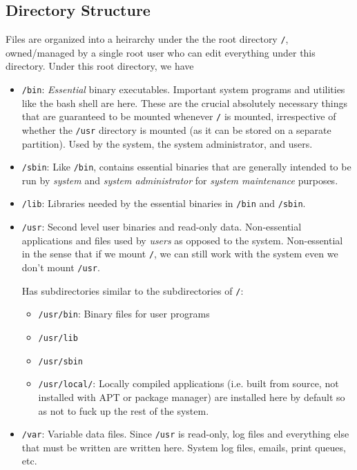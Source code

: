\documentclass[12pt]{article}
\theoremstyle{plain}
\theoremstyle{definition}
\theoremstyle{remark}
\begin{document}
\subsection{Directory Structure}

Files are organized into a heirarchy under the the root directory
\texttt{/}, owned/managed by a single root user who can edit everything
under this directory.
Under this root directory, we have
\begin{itemize}
  \item \texttt{/bin}: \emph{Essential} binary executables.
    Important system programs and utilities like the bash shell are
    here.
    These are the crucial absolutely necessary things that are
    guaranteed to be mounted whenever \texttt{/} is mounted,
    irrespective of whether the \texttt{/usr} directory is mounted (as
    it can be stored on a separate partition).
    Used by the system, the system administrator, and users.

  \item \texttt{/sbin}: Like \texttt{/bin}, contains essential binaries
    that are generally intended to be run by \emph{system} and
    \emph{system administrator} for \emph{system maintenance} purposes.

  \item \texttt{/lib}:
    Libraries needed by the essential binaries in \texttt{/bin} and
    \texttt{/sbin}.

  \item \texttt{/usr}:
    Second level user binaries and read-only data.
    Non-essential applications and files used by \emph{users} as opposed
    to the system. Non-essential in the sense that if we mount
    \texttt{/}, we can still work with the system even we don't mount
    \texttt{/usr}.


    Has subdirectories similar to the subdirectories of \texttt{/}:
    \begin{itemize}
      \item \texttt{/usr/bin}:
        Binary files for user programs
      \item \texttt{/usr/lib}
      \item \texttt{/usr/sbin}
      \item \texttt{/usr/local/}:
        Locally compiled applications (i.e. built from source, not
        installed with APT or package manager) are installed here by
        default so as not to fuck up the rest of the system.
    \end{itemize}
  \item \texttt{/var}:
    Variable data files.
    Since \texttt{/usr} is read-only, log files and everything else that
    must be written are written here.
    System log files, emails, print queues, etc.



\end{itemize}
\end{document}
